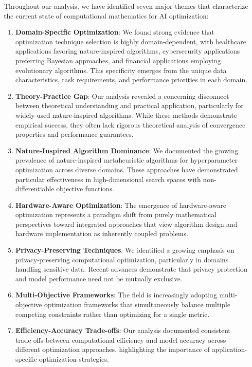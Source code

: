 \documentclass[acmsmall]{acmart}
\begin{document}
Throughout our analysis, we have identified seven major themes that characterize the current state of computational mathematics for AI optimization:

\begin{enumerate}
    \item \textbf{Domain-Specific Optimization}: We found strong evidence that optimization technique selection is highly domain-dependent, with healthcare applications favoring nature-inspired algorithms, cybersecurity applications preferring Bayesian approaches, and financial applications employing evolutionary algorithms. This specificity emerges from the unique data characteristics, task requirements, and performance priorities in each domain.

    \item \textbf{Theory-Practice Gap}: Our analysis revealed a concerning disconnect between theoretical understanding and practical application, particularly for widely-used nature-inspired algorithms. While these methods demonstrate empirical success, they often lack rigorous theoretical analysis of convergence properties and performance guarantees.

    \item \textbf{Nature-Inspired Algorithm Dominance}: We documented the growing prevalence of nature-inspired metaheuristic algorithms for hyperparameter optimization across diverse domains. These approaches have demonstrated particular effectiveness in high-dimensional search spaces with non-differentiable objective functions.

    \item \textbf{Hardware-Aware Optimization}: The emergence of hardware-aware optimization represents a paradigm shift from purely mathematical perspectives toward integrated approaches that view algorithm design and hardware implementation as inherently coupled problems.

    \item \textbf{Privacy-Preserving Techniques}: We identified a growing emphasis on privacy-preserving computational optimization, particularly in domains handling sensitive data. Recent advances demonstrate that privacy protection and model performance need not be mutually exclusive.

    \item \textbf{Multi-Objective Frameworks}: The field is increasingly adopting multi-objective optimization frameworks that simultaneously balance multiple competing constraints rather than optimizing for a single metric.

    \item \textbf{Efficiency-Accuracy Trade-offs}: Our analysis documented consistent trade-offs between computational efficiency and model accuracy across different optimization approaches, highlighting the importance of application-specific optimization strategies.
\end{enumerate}
\end{document}
